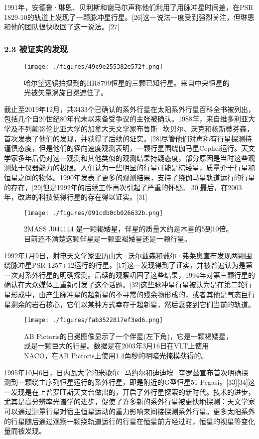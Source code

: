 1991年，安德鲁·琳恩、贝利斯和谢马尔声称他们利用了用脉冲星时间差，在PSR 1829-10的轨道上发现了一颗脉冲星行星。[26]这一说法一度受到强烈关注，但琳恩和他的团队很快收回了这一说法。[27]
\subsubsection{2.3 被证实的发现}
\begin{figure}[ht]
\centering
\texttt{[image: ./figures/49c9e255382e572f.png]}
\caption{哈尔望远镜拍摄到的HR8799恒星的三颗已知行星。来自中央恒星的光被矢量涡旋日冕遮住了。} \label{fig_TYXWXX_2}
\end{figure}
截止至2019年12月，共3433个已确认的系外行星在太阳系外行星百科全书被列出，包括几个自20世纪80年代末以来备受争议的主张被确认。1988年，来自维多利亚大学及不列颠哥伦比亚大学的加拿大天文学家布鲁斯·坎贝尔、沃克和杨斯蒂芬森，首次发表了他们的发现，并获得了后续的证实。[28]尽管他们对声称有行星探测持谨慎态度，但是他们的径向速度观测表明，一颗行星围绕伽马星Cephei运行。天文学家多年后仍对这一观测和其他类似的观测结果持疑态度，部分原因是当时这些观测处于仪器能力的极限。人们认为一些明显的行星可能是棕矮星，质量介于行星和恒星之间的物体。1990年发表了更多的观测结果，支持了绕伽马星轨道运行的行星的存在，[29]但是1992年的后续工作再次引起了严重的怀疑。[30]最后，在2003年，改进的科技使得行星的存在得以证实。[31]
\begin{figure}[ht]
\centering
\texttt{[image: ./figures/091cdb0cb026632b.png]}
\caption{2MASS J044144 是一颗褐矮星，伴星的质量大约是木星的5到10倍。目前还不清楚这颗伴星是一颗亚褐矮星还是一颗行星。} \label{fig_TYXWXX_3}
\end{figure}
1992年1月9日，射电天文学家亚历山大·沃尔兹森和戴尔·弗莱奥宣布发现两颗围绕脉冲星PSR 1257+12运行的行星。[17]这一发现得到了证实，并被普遍认为是第一次对系外行星的明确探测。后续的观察巩固了这些结果，1994年对第三颗行星的确认在大众媒体上重新引发了这个话题。[32]这些脉冲星行星被认为是在第二轮行星形成中，由产生脉冲星的超新星的不寻常的残余物形成的，或者其他是气态巨行星剩余的岩石核心，它们以某种方式幸存于超新星，然后衰变到它们当前的轨道。
\begin{figure}[ht]
\centering
\texttt{[image: ./figures/fab3522817ef3ed6.png]}
\caption{AB Pictoris的日冕图像显示了一个伴星(左下角)，它是一颗褐矮星，或是一颗巨大的行星。数据是在2003年3月16日在VLT上使用NACO，在AB Pictoris上使用1.4角秒的明暗光掩模获得的。} \label{fig_TYXWXX_4}
\end{figure}
1995年10月6日，日内瓦大学的米歇尔·马约尔和迪迪埃·奎罗兹宣布首次明确探测到一颗绕主序列恒星运行的系外行星，即是附近的G型恒星51 Pegasi。[33][34]这一发现是在上普罗旺斯天文台做出的，开启了外行星探索的新时代。技术的进步，尤其是高分辨率光谱学的进步，促使了许多新的系外行星被更快地探测：天文学家可以通过测量行星对宿主恒星运动的重力影响来间接探测系外行星。更多太阳系外的行星随后通过观察一颗绕轨道运行的行星在恒星前方经过时，恒星的视星等变化量而被发现。

